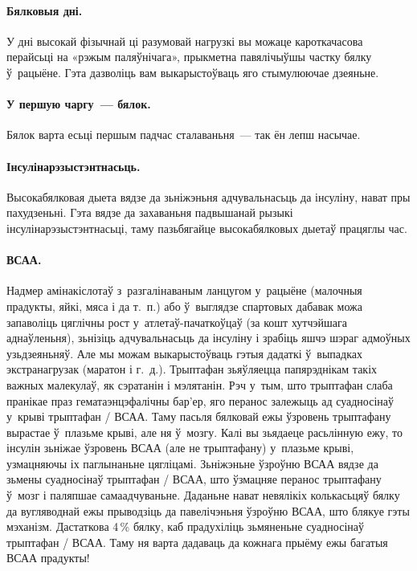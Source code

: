 \paragraph{Бялковыя дні.}
У дні высокай фізычнай ці разумовай нагрузкі вы можаце кароткачасова перайсьці на «рэжым паляўнічага», прыкметна павялічыўшы частку бялку ў~рацыёне. Гэта дазволіць вам выкарыстоўваць яго стымулюючае дзеяньне.

\paragraph{У першую чаргу~--- бялок.}
Бялок варта есьці першым падчас сталаваньня~--- так ён лепш насычае.

\paragraph{Інсулінарэзыстэнтнасьць.}
Высокабялковая дыета вядзе да зьніжэньня адчувальнасьць да інсуліну, нават пры пахудзеньні. Гэта вядзе да захаваньня падвышанай рызыкі інсулінарэзыстэнтнасьці, таму пазьбягайце высокабялковых дыетаў працяглы час.

\paragraph{ВСАА.}
Надмер амінакіслотаў з~разгалінаваным ланцугом у~рацыёне (малочныя прадукты, яйкі, мяса і да т.~п.) або ў~выглядзе спартовых дабавак можа запаволіць цяглічны рост у~атлетаў-пачаткоўцаў (за кошт хутчэйшага аднаўленьня), зьнізіць адчувальнасьць да інсуліну і зрабіць яшчэ шэраг адмоўных узьдзеяньняў. Але мы можам выкарыстоўваць гэтыя дадаткі ў~выпадках экстранагрузак (маратон і г.~д.). Трыптафан зьяўляецца папярэднікам такіх важных малекулаў, як сэратанін і мэлятанін. Рэч у~тым, што трыптафан слаба пранікае праз гематаэнцэфалічны бар'ер, яго перанос залежыць ад суадносінаў у~крыві трыптафан / ВСАА. Таму пасьля бялковай ежы ўзровень трыптафану вырастае ў~плазьме крыві, але ня ў~мозгу. Калі вы зьядаеце расьлінную ежу, то інсулін зьніжае ўзровень ВСАА (але не трыптафану) у~плазьме крыві, узмацняючы іх паглынаньне цягліцамі. Зьніжэньне ўзроўню ВСАА вядзе да зьмены суадносінаў трыптафан / ВСАА, што ўзмацняе перанос трыптафану ў~мозг і паляпшае самаадчуваньне. Даданьне нават невялікіх колькасьцяў бялку да вугляводнай ежы прыводзіць да павелічэньня ўзроўню ВСАА, што блякуе гэты мэханізм. Дастаткова 4\,\% бялку, каб прадухіліць зьмяненьне суадносінаў трыптафан / ВСАА. Таму ня варта дадаваць да кожнага прыёму ежы багатыя ВСАА прадукты!

